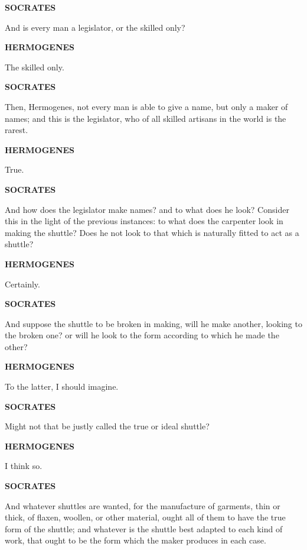 \documentclass[11pt,letter]{article}
\begin{document}
\par \textbf{SOCRATES}
\par   And is every man a legislator, or the skilled only?

\par \textbf{HERMOGENES}
\par   The skilled only.

\par \textbf{SOCRATES}
\par   Then, Hermogenes, not every man is able to give a name, but only a maker of names; and this is the legislator, who of all skilled artisans in the world is the rarest.

\par \textbf{HERMOGENES}
\par   True.

\par \textbf{SOCRATES}
\par   And how does the legislator make names? and to what does he look? Consider this in the light of the previous instances:  to what does the carpenter look in making the shuttle? Does he not look to that which is naturally fitted to act as a shuttle?

\par \textbf{HERMOGENES}
\par   Certainly.

\par \textbf{SOCRATES}
\par   And suppose the shuttle to be broken in making, will he make another, looking to the broken one? or will he look to the form according to which he made the other?

\par \textbf{HERMOGENES}
\par   To the latter, I should imagine.

\par \textbf{SOCRATES}
\par   Might not that be justly called the true or ideal shuttle?

\par \textbf{HERMOGENES}
\par   I think so.

\par \textbf{SOCRATES}
\par   And whatever shuttles are wanted, for the manufacture of garments, thin or thick, of flaxen, woollen, or other material, ought all of them to have the true form of the shuttle; and whatever is the shuttle best adapted to each kind of work, that ought to be the form which the maker produces in each case.
\end{document}
